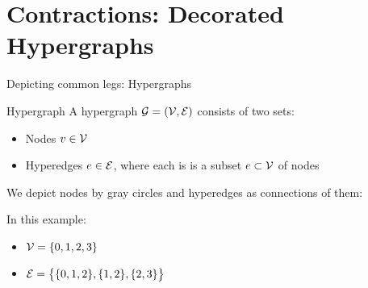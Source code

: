 \documentclass{beamer}
\begin{document}
%
%
%





\section{Contractions: Decorated Hypergraphs}



\begin{frame}{Depicting common legs: Hypergraphs}

\begin{definition}{Hypergraph}
	A hypergraph $\mathcal{G}=(\mathcal{V},\mathcal{E})$ consists of two sets:
	\begin{itemize}
		\item Nodes $v\in\mathcal{V}$ 
		\item Hyperedges $e\in\mathcal{E}$, where each is is a subset $e\subset\mathcal{V}$ of nodes
	\end{itemize}
\end{definition}


We depict nodes by gray circles and hyperedges as connections of them:
\begin{center}
	
\end{center}
In this example:
\begin{itemize}
	\item $\mathcal{V} = \{0,1,2,3\}$
	\item $\mathcal{E} = \big\{ \{0,1,2\}, \{1,2\}, \{2,3\}  \big\}$
\end{itemize}

\end{frame}
\end{document}
